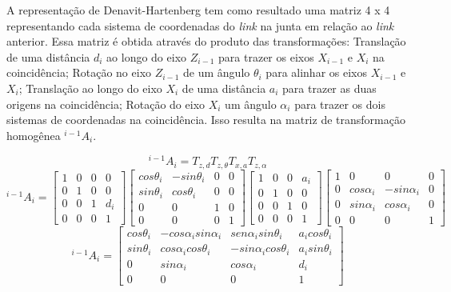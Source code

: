 A representação de Denavit-Hartenberg \cite{denavit1955kinematic} tem como resultado uma matriz 4 x 4 representando cada sistema de coordenadas do \textit{link} na junta em relação ao \textit{link} anterior. Essa matriz é obtida através do produto das transformações: Translação de uma distância $d_{i}$ ao longo do eixo $Z_{i-1}$ para trazer os eixos $X_{i-1}$ e $X_{i}$ na coincidência; Rotação no eixo $Z_{i-1}$ de um ângulo $\theta_{i}$ para alinhar os eixos $X_{i-1}$ e $X_{i}$; Translação ao longo do eixo $X_{i}$ de uma distância $a_{i}$ para trazer as duas origens na coincidência; Rotação do eixo $X_{i}$ um ângulo $\alpha_{i}$ para trazer os dois sistemas de coordenadas na coincidência. Isso resulta na matriz de transformação homogênea $^{i-1}A_{i}$.

\begin{equation}
^{i-1}A_{i}=T_{z,d} T_{z,\theta} T_{x,a} T_{z,\alpha}
\end{equation}
\begin{equation}
^{i-1}A_{i}=\begin{bmatrix}
1 & 0 & 0 & 0\\ 
0 & 1 & 0 & 0\\ 
0 & 0 & 1 & d_{i}\\ 
0 & 0 & 0 & 1
\end{bmatrix}\begin{bmatrix}
cos\theta_{i} & -sin\theta_{i} & 0 & 0\\ 
sin\theta_{i} & cos\theta_{i} & 0 & 0\\ 
0 & 0 & 1 & 0\\ 
0 & 0 & 0 & 1
\end{bmatrix}\begin{bmatrix}
1 & 0 & 0 & a_{i}\\ 
0 & 1 & 0 & 0\\ 
0 & 0 & 1 & 0\\ 
0 & 0 & 0 & 1
\end{bmatrix}\begin{bmatrix}
1 & 0 & 0 & 0\\ 
0 & cos\alpha_{i} & -sin\alpha_{i} & 0\\ 
0 & sin\alpha_{i} & cos\alpha_{i} & 0\\ 
0 & 0 & 0 & 1
\end{bmatrix}\end{equation}
\begin{equation}
^{i-1}A_{i}=\begin{bmatrix}
cos\theta_{i} & -cos\alpha_{i}sin\alpha_{i} & sen\alpha_{i}sin\theta_{i} & a_{i}cos\theta_{i}\\ 
sin\theta_{i} & cos\alpha_{i}cos\theta_{i} & -sin\alpha_{i}cos\theta_{i} & a_{i}sin\theta_{i}\\ 
0 & sin\alpha_{i} & cos\alpha_{i} & d_{i}\\ 
0 & 0 & 0 & 1
\end{bmatrix}
\end{equation}

